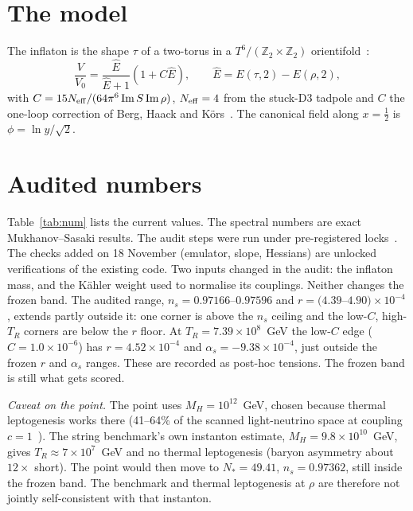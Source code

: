 \documentclass[aps,prd,twocolumn,superscriptaddress,nofootinbib,showkeys]{revtex4-2}
\begin{document}
\section{The model}
The inflaton is the shape $\tau$ of a two-torus in a $T^6/(\mathbb Z_2\times\mathbb Z_2)$ orientifold~\cite{P3}:
\begin{equation}
\frac{V}{V_0}=\frac{\hat E}{\hat E+1}(1+C\hat E),\qquad \hat E=E(\tau,2)-E(\rho,2),
\end{equation}
with $C=15N_{\rm eff}/(64\pi^6\,\mathrm{Im}\,S\,\mathrm{Im}\,\rho)$, $N_{\rm eff}=4$ from the stuck-D3 tadpole and $C$ the one-loop correction of Berg, Haack and K\"ors~\cite{BHK}. The canonical field along $x=\tfrac12$ is $\phi=\ln y/\sqrt2$.

\section{Audited numbers}
Table~\ref{tab:num} lists the current values. The spectral numbers are exact Mukhanov--Sasaki results. The audit steps were run under pre-registered locks~\cite{P4,P5}. The checks added on 18 November (emulator, slope, Hessians) are unlocked verifications of the existing code. Two inputs changed in the audit: the inflaton mass, and the K\"ahler weight used to normalise its couplings. Neither changes the frozen band. The audited range, $n_s=0.97166$--$0.97596$ and $r=(4.39$--$4.90)\times10^{-4}$, extends partly outside it: one corner is above the $n_s$ ceiling and the low-$C$, high-$T_R$ corners are below the $r$ floor. At $T_R=7.39\times10^8$~GeV the low-$C$ edge ($C=1.0\times10^{-6}$) has $r=4.52\times10^{-4}$ and $\alpha_s=-9.38\times10^{-4}$, just outside the frozen $r$ and $\alpha_s$ ranges. These are recorded as post-hoc tensions. The frozen band is still what gets scored.

\emph{Caveat on the point.} The point uses $M_H=10^{12}$~GeV, chosen because thermal leptogenesis works there (41--64\% of the scanned light-neutrino space at coupling $c=1$~\cite{P5}). The string benchmark's own instanton estimate, $M_H=9.8\times10^{10}$~GeV, gives $T_R\approx7\times10^7$~GeV and no thermal leptogenesis (baryon asymmetry about $12\times$ short). The point would then move to $N_*=49.41$, $n_s=0.97362$, still inside the frozen band. The benchmark and thermal leptogenesis at $\rho$ are therefore not jointly self-consistent with that instanton.
\end{document}
